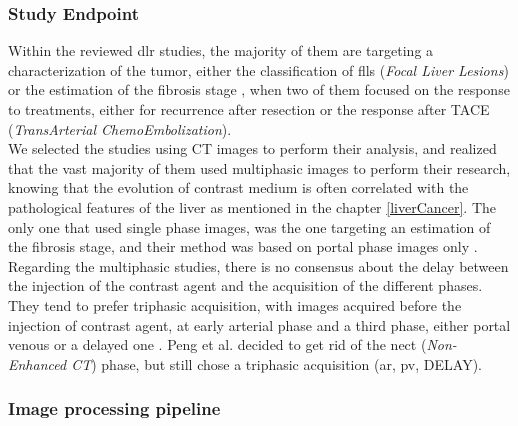 \subsubsection{Study Endpoint}\label{study-endpoint}

Within the reviewed \ac{dlr} studies, the majority of them are
targeting a characterization of the tumor, either the classification of \ac{fll}s (\emph{Focal
Liver Lesions}) \cite{Yamada2019,Wang2018,Yasaka2018,Liang2018} or the estimation of the fibrosis
stage \cite{Yasaka2018a}, when two of them focused on the
response to treatments, either for recurrence after resection \cite{WANG2019} or the response after TACE (\emph{TransArterial ChemoEmbolization})\cite{Peng2020}.\\
We selected the studies using CT images to perform their
analysis, and realized that the vast majority of them used multiphasic
images to perform their research, knowing that the evolution of contrast
medium is often correlated with the pathological features of the liver
as mentioned in the chapter \ref{liverCancer}. The only one that used
single phase images, was the one targeting an estimation of the fibrosis
stage, and their method was based on portal phase images only \cite{Yasaka2018a}. 
Regarding the multiphasic studies,
there is no consensus about the delay between the injection of the
contrast agent and the acquisition of the different phases. They tend to
prefer triphasic acquisition, with images acquired before the injection
of contrast agent, at early arterial phase and a third phase, either
portal venous \cite{WANG2019,Wang2018,Liang2018} or a delayed one \cite{Yamada2019, Yasaka2018}. Peng et al. decided to get rid of the \ac{nect}
(\emph{Non-Enhanced CT}) phase, but still chose a triphasic acquisition
(\ac{ar}, \ac{pv}, DELAY).

\subsubsection{Image processing pipeline}\label{image-processing-pipeline}


